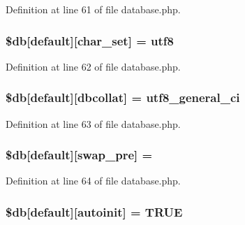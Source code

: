 Definition at line 61 of file database.\+php.

\subsubsection[{\texorpdfstring{\$db}{$db}}]{\setlength{\rightskip}{0pt plus 5cm}\$db\mbox{[}\textquotesingle{}default\textquotesingle{}\mbox{]}\mbox{[}\textquotesingle{}char\+\_\+set\textquotesingle{}\mbox{]} = \textquotesingle{}utf8\textquotesingle{}}\hypertarget{database_8php_a581bc2f1f3fa806239c44e2c2293dc59}{}\label{database_8php_a581bc2f1f3fa806239c44e2c2293dc59}


Definition at line 62 of file database.\+php.

\subsubsection[{\texorpdfstring{\$db}{$db}}]{\setlength{\rightskip}{0pt plus 5cm}\$db\mbox{[}\textquotesingle{}default\textquotesingle{}\mbox{]}\mbox{[}\textquotesingle{}dbcollat\textquotesingle{}\mbox{]} = \textquotesingle{}utf8\+\_\+general\+\_\+ci\textquotesingle{}}\hypertarget{database_8php_ab03697bf8340acfa74bf20c952aa81c7}{}\label{database_8php_ab03697bf8340acfa74bf20c952aa81c7}


Definition at line 63 of file database.\+php.

\subsubsection[{\texorpdfstring{\$db}{$db}}]{\setlength{\rightskip}{0pt plus 5cm}\$db\mbox{[}\textquotesingle{}default\textquotesingle{}\mbox{]}\mbox{[}\textquotesingle{}swap\+\_\+pre\textquotesingle{}\mbox{]} = \textquotesingle{}\textquotesingle{}}\hypertarget{database_8php_af35b6847ece1c0a956c97ebb90186e45}{}\label{database_8php_af35b6847ece1c0a956c97ebb90186e45}


Definition at line 64 of file database.\+php.

\subsubsection[{\texorpdfstring{\$db}{$db}}]{\setlength{\rightskip}{0pt plus 5cm}\$db\mbox{[}\textquotesingle{}default\textquotesingle{}\mbox{]}\mbox{[}\textquotesingle{}autoinit\textquotesingle{}\mbox{]} = T\+R\+UE}\hypertarget{database_8php_a217a1c42eadc83da9cdd9e3d694e53fa}{}\label{database_8php_a217a1c42eadc83da9cdd9e3d694e53fa}


